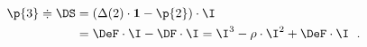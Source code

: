 \begin{equation}
  \label{eq:D3}
  \begin{split}
    \p{3} \doteqdot \DS &= \left(\Delta(2)\cdot{\bf 1} - \p{2} \right)\cdot\I\\*
    &= \DeF\cdot\I - \DF\cdot\I = \I^3 - \rho\cdot\I^2 + \DeF\cdot\I\ \; .
  \end{split}
\end{equation}

